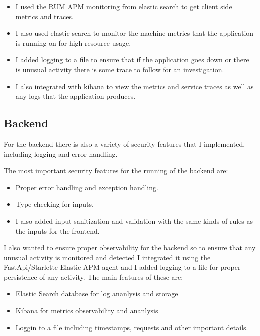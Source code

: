 \documentclass[a4paper,10pt]{article}
\newcounter{req}[subsection]
\begin{document}
\begin{itemize}
	\item I used the RUM APM monitoring from elastic search to get client side
	      metrics and traces.
	\item I also used elastic search to monitor the machine metrics that the
	      application is running on for high resource usage.
	\item I added logging to a file to ensure that if the application goes down or
	      there is unusual activity there is some trace to follow for an
	      investigation.
	\item I also integrated with kibana to view the metrics and service traces as
	      well as any logs that the application produces.
\end{itemize}

\subsection{Backend}

For the backend there is also a variety of security features that I implemented,
including logging and error handling.

The most important security features for the running of the backend are:

\begin{itemize}
	\item Proper error handling and exception handling.
	\item Type checking for inputs.
	\item I also added input sanitization and validation with the same kinds of
	      rules as the inputs for the frontend.
\end{itemize}

I also wanted to ensure proper observability for the backend so to ensure that
any unusual activity is monitored and detected I integrated it using the
FastApi/Starlette Elastic APM agent and I added logging to a file for proper
persistence of any activity. The main features of these are:

\begin{itemize}
	\item Elastic Search database for log ananlysis and storage
	\item Kibana for metrics observability and ananlysis
	\item Loggin to a file including timestamps, requests and other important
	      details.
\end{itemize}
\end{document}
